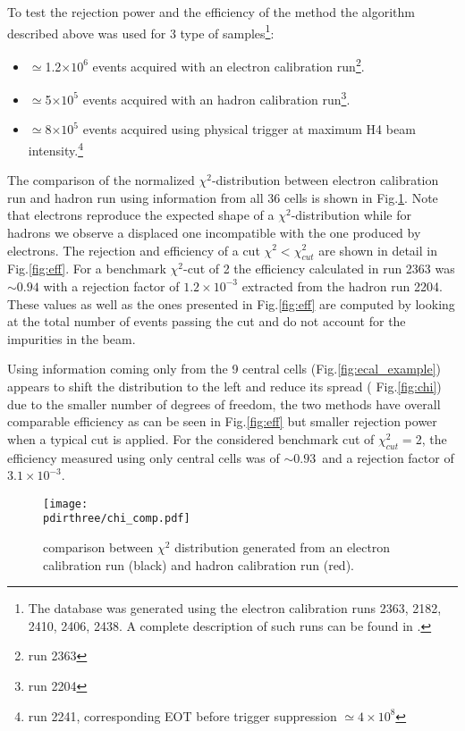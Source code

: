 To test the rejection power and the efficiency of the
method the algorithm described above was used for 3 type of samples\footnote{The database was generated using the electron  calibration runs 2363, 2182, 2410, 2406, 2438. A complete description of such runs can be found in \cite{na64-runs}. }:
\begin{itemize}
\item $\simeq$1.2$\times 10^{6}$ events acquired with an electron calibration run\footnote{run 2363}.
\item $\simeq$5$\times 10^{5}$ events acquired with an hadron calibration run\footnote{run 2204}.
\item $\simeq$8$\times 10^{5}$ events acquired using physical trigger at maximum H4 beam intensity.\footnote{run 2241, corresponding EOT before trigger suppression $\simeq 4 \times 10^{8}$}
\end{itemize}

The comparison of the normalized $\chi^2$-distribution between
electron calibration run and hadron run using information from all 36
cells is shown in Fig.\ref{fig:chi2}. Note that electrons reproduce
the expected shape of a $\chi^2$-distribution while for hadrons we
observe a displaced one incompatible with the one produced by
electrons.  The rejection and efficiency of a cut
$\chi^2 < \chi^2_{cut}$ are shown in detail in Fig.\ref{fig:eff}. For
a benchmark $\chi^2$-cut of 2 the efficiency calculated in run 2363
was $\sim 0.94$ with a rejection factor of $1.2\times 10^{-3}$
extracted from the hadron run 2204. These values as well as the ones
presented in Fig.\ref{fig:eff} are computed by looking at the total
number of events passing the cut and do not account for the impurities
in the beam.

Using information coming only from the 9 central
cells (Fig.\ref{fig:ecal_example}) appears to shift the distribution
to the left and reduce its spread ( Fig.\ref{fig:chi}) due to the
smaller number of degrees of freedom, the two methods have overall
comparable efficiency as can be seen in Fig.\ref{fig:eff} but smaller
rejection power when a typical cut is applied.  For the considered
benchmark cut of $\chi^2_{cut}=$2, the efficiency measured using only
central cells was of $\sim 0.93$\ and a rejection factor of
$3.1\times 10^{-3}$.


\begin{figure}[h!]
  \begin{center}
    \texttt{[image: \\pdirthree/chi\_comp.pdf]}
  \end{center}
  \caption[comparison between $\chi^2$ distribution, electron and hadron calibration run]{comparison between $\chi^2$ distribution generated from an electron calibration run (black) and hadron calibration run (red).}
  \label{fig:chi2}
\end{figure}


